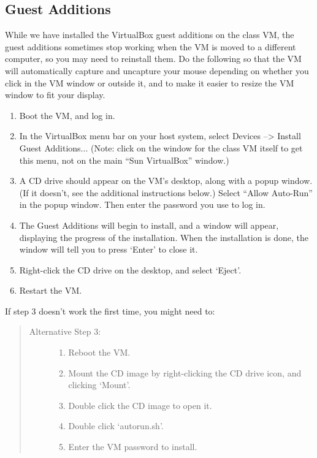 \documentclass[letterpaper,10pt,english]{sphinxmanual}
\begin{document}
\subsection{Guest Additions}
\label{vm:guest-additions}\label{vm:vm-additions}
While we have installed the VirtualBox guest additions on the class
VM, the guest additions sometimes stop working when the VM is moved to
a different computer, so you may need to reinstall them.
Do the following so that the VM will automatically capture and uncapture
your mouse depending on whether you click in the VM window or outside it,
and to make it easier to resize the VM window to fit your display.
\begin{enumerate}
\item {} 
Boot the VM, and log in.

\item {} 
In the VirtualBox menu bar on your host system, select Devices --\textgreater{}
Install Guest Additions...  (Note: click on the window for the class
VM itself to get this menu, not on the main ``Sun VirtualBox'' window.)

\item {} 
A CD drive should appear on the VM's desktop, along with a popup
window.  (If it doesn't, see the additional instructions below.)
Select ``Allow Auto-Run'' in the popup window.  Then enter the
password you use to log in.

\item {} 
The Guest Additions will begin to install, and a window will appear,
displaying the progress of the installation.  When the installation is done,
the window will tell you to press `Enter' to close it.

\item {} 
Right-click the CD drive on the desktop, and select `Eject'.

\item {} 
Restart the VM.

\end{enumerate}

If step 3 doesn't work the first time, you might need to:
\begin{quote}
\begin{description}
\item[{Alternative Step 3:}] \leavevmode\begin{enumerate}
\item {} 
Reboot the VM.

\item {} 
Mount the CD image by right-clicking the CD drive icon, and clicking
`Mount'.

\item {} 
Double click the CD image to open it.

\item {} 
Double click `autorun.sh'.

\item {} 
Enter the VM password to install.

\end{enumerate}

\end{description}
\end{quote}
\end{document}
